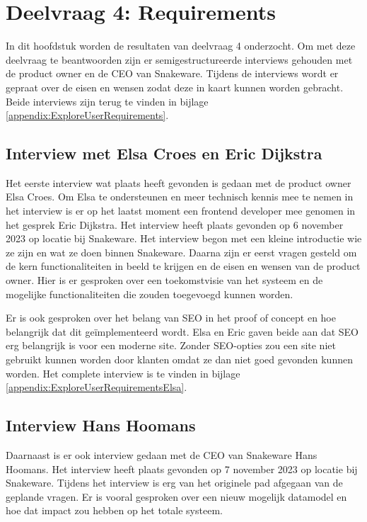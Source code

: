 \section{Deelvraag 4: Requirements}
\label{sec:Requirements}
In dit hoofdstuk worden de resultaten van deelvraag 4 \textit{\SubquestionFour} onderzocht.
Om met deze deelvraag te beantwoorden zijn er semigestructureerde interviews gehouden met de product owner en de CEO van Snakeware.
Tijdens de interviews wordt er gepraat over de eisen en wensen zodat deze in kaart kunnen worden gebracht.
Beide interviews zijn terug te vinden in bijlage \ref{appendix:ExploreUserRequirements}.

\subsection{Interview met Elsa Croes en Eric Dijkstra}
Het eerste interview wat plaats heeft gevonden is gedaan met de product owner Elsa Croes.
Om Elsa te ondersteunen en meer technisch kennis mee te nemen in het interview is er op het laatst moment een frontend developer mee genomen in het gesprek Eric Dijkstra.
Het interview heeft plaats gevonden op 6 november 2023 op locatie bij Snakeware.
Het interview begon met een kleine introductie wie ze zijn en wat ze doen binnen Snakeware.
Daarna zijn er eerst vragen gesteld om de kern functionaliteiten in beeld te krijgen en de eisen en wensen van de product owner.
Hier is er gesproken over een toekomstvisie van het systeem en de mogelijke functionaliteiten die zouden toegevoegd kunnen worden.

\whitespace
Er is ook gesproken over het belang van SEO in het proof of concept en hoe belangrijk dat dit geïmplementeerd wordt.
Elsa en Eric gaven beide aan dat SEO erg belangrijk is voor een moderne site.
Zonder SEO-opties zou een site niet gebruikt kunnen worden door klanten omdat ze dan niet goed gevonden kunnen worden.
Het complete interview is te vinden in bijlage \ref{appendix:ExploreUserRequirementsElsa}.

\subsection{Interview Hans Hoomans}
Daarnaast is er ook interview gedaan met de CEO van Snakeware Hans Hoomans.
Het interview heeft plaats gevonden op 7 november 2023 op locatie bij Snakeware.
Tijdens het interview is erg van het originele pad afgegaan van de geplande vragen.
Er is vooral gesproken over een nieuw mogelijk datamodel en hoe dat impact zou hebben op het totale systeem.

